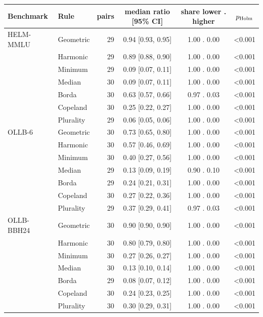 \begin{tabular}{llrccc}\toprule
Benchmark & Rule & pairs & median ratio [95\% CI] & share lower . higher & $p_{\rm Holm}$\\\midrule
HELM-MMLU & Geometric & 29 & 0.94 [0.93, 0.95] & 1.00 . 0.00 & <0.001\\
 & Harmonic & 29 & 0.89 [0.88, 0.90] & 1.00 . 0.00 & <0.001\\
 & Minimum & 29 & 0.09 [0.07, 0.11] & 1.00 . 0.00 & <0.001\\
 & Median & 30 & 0.09 [0.07, 0.11] & 1.00 . 0.00 & <0.001\\
 & Borda & 30 & 0.63 [0.57, 0.66] & 0.97 . 0.03 & <0.001\\
 & Copeland & 30 & 0.25 [0.22, 0.27] & 1.00 . 0.00 & <0.001\\
 & Plurality & 29 & 0.06 [0.05, 0.06] & 1.00 . 0.00 & <0.001\\
\midrule
OLLB-6 & Geometric & 30 & 0.73 [0.65, 0.80] & 1.00 . 0.00 & <0.001\\
 & Harmonic & 30 & 0.57 [0.46, 0.69] & 1.00 . 0.00 & <0.001\\
 & Minimum & 30 & 0.40 [0.27, 0.56] & 1.00 . 0.00 & <0.001\\
 & Median & 29 & 0.13 [0.09, 0.19] & 0.90 . 0.10 & <0.001\\
 & Borda & 29 & 0.24 [0.21, 0.31] & 1.00 . 0.00 & <0.001\\
 & Copeland & 30 & 0.27 [0.22, 0.36] & 1.00 . 0.00 & <0.001\\
 & Plurality & 29 & 0.37 [0.29, 0.41] & 0.97 . 0.03 & <0.001\\
\midrule
OLLB-BBH24 & Geometric & 30 & 0.90 [0.90, 0.90] & 1.00 . 0.00 & <0.001\\
 & Harmonic & 30 & 0.80 [0.79, 0.80] & 1.00 . 0.00 & <0.001\\
 & Minimum & 30 & 0.27 [0.26, 0.27] & 1.00 . 0.00 & <0.001\\
 & Median & 30 & 0.13 [0.10, 0.14] & 1.00 . 0.00 & <0.001\\
 & Borda & 29 & 0.08 [0.07, 0.12] & 1.00 . 0.00 & <0.001\\
 & Copeland & 30 & 0.24 [0.23, 0.25] & 1.00 . 0.00 & <0.001\\
 & Plurality & 30 & 0.30 [0.29, 0.31] & 1.00 . 0.00 & <0.001\\
\bottomrule\end{tabular}
